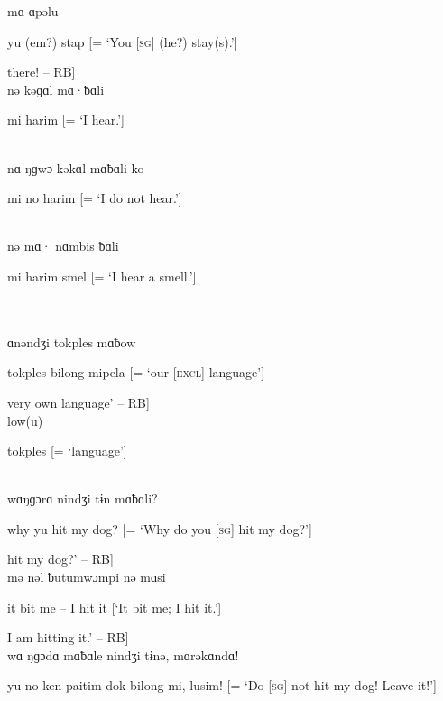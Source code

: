 \noindent mɑ ɑpəlu

\noindent yu (em?) stap [= ‘You [\textsc{sg}] (he?) stay(s).’]

\noindent [‘Stay [\textsc{sg}] there! -- RB]\\

\noindent nə kəɡɑl mɑ·ƀɑli

\noindent mi harim [= ‘I hear.’]

\noindent [‘I hear it.’ -- RB]\\

\noindent nɑ ŋɡwɔ kəkɑl mɑƀɑli ko

\noindent mi no harim [= ‘I do not hear.’]

\\

\noindent nə mɑ· nɑmbis ƀɑli

\noindent mi harim smel [= ‘I hear a smell.’]

\\

\\

\noindent ɑnəndʒi tokples mɑƀow

\noindent tokples bilong mipela [= ‘our [\textsc{excl}] language’]

\noindent [‘our [\textsc{excl}] very own language’ -- RB]\\

\noindent low(u)

\noindent tokples [= ‘language’]

\noindent [‘language’ -- RB]\\

\noindent wɑŋɡɔrɑ nindʒi tɨn mɑƀɑli?

\noindent why yu hit my dog? [= ‘Why do you [\textsc{sg]} hit my dog?’]

\noindent [‘Why do you [\textsc{sg}] hit my dog?’ -- RB]\\

\noindent mə nəl ƀutumwɔmpi nə mɑsi

\noindent it bit me – I hit it [‘It bit me; I hit it.’]

\noindent [‘It bit me, [so] I am hitting it.’ -- RB]\\

\noindent wɑ ŋɡɔdɑ mɑƀɑle nindʒi tɨnə, mɑrəkɑndɑ!

\noindent yu no ken paitim dok bilong mi, lusim! [= ‘Do [\textsc{sg}] not hit my dog! Leave it!’]

